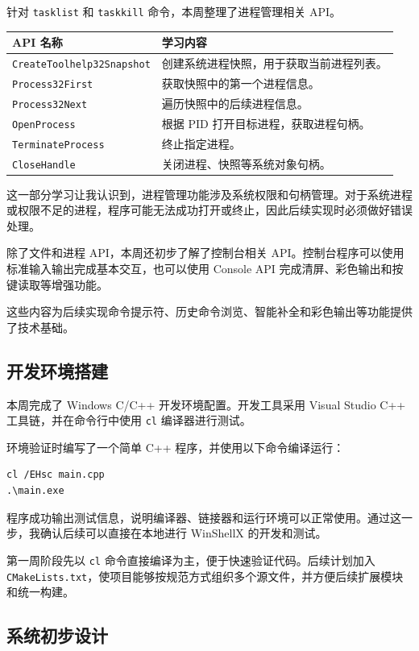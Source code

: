 \documentclass[UTF8]{ctexart}
\begin{document}
针对 \texttt{tasklist} 和 \texttt{taskkill} 命令，本周整理了进程管理相关 API。

\begin{longtable}{p{5cm}p{9cm}}
\toprule
API 名称 & 学习内容 \\
\midrule
\texttt{CreateToolhelp32Snapshot} & 创建系统进程快照，用于获取当前进程列表。 \\
\texttt{Process32First} & 获取快照中的第一个进程信息。 \\
\texttt{Process32Next} & 遍历快照中的后续进程信息。 \\
\texttt{OpenProcess} & 根据 PID 打开目标进程，获取进程句柄。 \\
\texttt{TerminateProcess} & 终止指定进程。 \\
\texttt{CloseHandle} & 关闭进程、快照等系统对象句柄。 \\
\bottomrule
\end{longtable}

这一部分学习让我认识到，进程管理功能涉及系统权限和句柄管理。对于系统进程或权限不足的进程，程序可能无法成功打开或终止，因此后续实现时必须做好错误处理。

除了文件和进程 API，本周还初步了解了控制台相关 API。控制台程序可以使用标准输入输出完成基本交互，也可以使用 Console API 完成清屏、彩色输出和按键读取等增强功能。

这些内容为后续实现命令提示符、历史命令浏览、智能补全和彩色输出等功能提供了技术基础。

\subsection{开发环境搭建}

本周完成了 Windows C/C++ 开发环境配置。开发工具采用 Visual Studio C++ 工具链，并在命令行中使用 \texttt{cl} 编译器进行测试。

环境验证时编写了一个简单 C++ 程序，并使用以下命令编译运行：

\begin{verbatim}
cl /EHsc main.cpp
.\main.exe
\end{verbatim}

程序成功输出测试信息，说明编译器、链接器和运行环境可以正常使用。通过这一步，我确认后续可以直接在本地进行 WinShellX 的开发和测试。

第一周阶段先以 \texttt{cl} 命令直接编译为主，便于快速验证代码。后续计划加入 \texttt{CMakeLists.txt}，使项目能够按规范方式组织多个源文件，并方便后续扩展模块和统一构建。

\subsection{系统初步设计}
\end{document}

